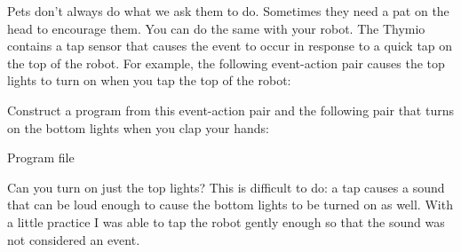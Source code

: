 


Pets don't always do what we ask them to do. Sometimes they need a pat
on the head to encourage them. You can do the same with your robot. The
Thymio contains a tap sensor that causes the event  to
occur in response to a quick tap on the top of the robot. For example,
the following event-action pair causes the top lights to turn on when
you tap the top of the robot: 

Construct a program from this event-action pair and the following pair
that turns on the bottom lights when you clap your hands: 

{\raggedleft \hfill Program file }

Can you turn on just the top lights? This is difficult to do: a tap
causes a sound that can be loud enough to cause the bottom lights to be
turned on as well. With a little practice I was able to tap the robot
gently enough so that the sound was not considered an event.


